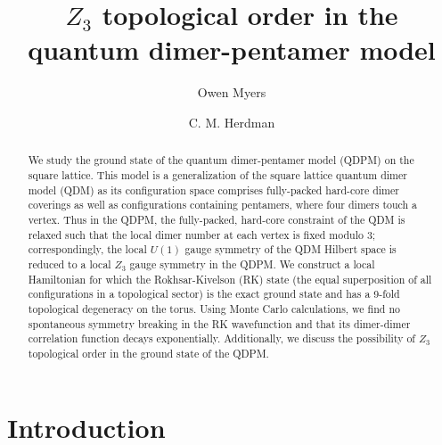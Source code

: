 \documentclass[twocolumn,prb,aps,floatfix,superscriptaddress]{revtex4-1}
\begin{document}
\title{$Z_3$ topological order in the quantum dimer-pentamer model}

\author{Owen Myers}

\author{C. M. Herdman}

\begin{abstract}
We study the ground state of the quantum dimer-pentamer model (QDPM) on the square lattice. This model is a generalization of the square lattice quantum dimer model (QDM) as its configuration space comprises fully-packed hard-core dimer coverings as well as configurations containing pentamers, where four dimers touch a vertex. Thus in the QDPM, the fully-packed, hard-core constraint of the QDM is relaxed such that the local dimer number at each vertex is fixed modulo 3; correspondingly, the local $U(1)$ gauge symmetry of the QDM Hilbert space is reduced to a local $Z_3$ gauge symmetry in the QDPM. We construct a local Hamiltonian for which the Rokhsar-Kivelson (RK) state (the equal superposition of all configurations in a topological sector) is the exact ground state and has a 9-fold topological degeneracy on the torus. Using Monte Carlo calculations, we find no spontaneous symmetry breaking in the RK wavefunction and that its dimer-dimer correlation function decays exponentially. Additionally, we discuss the possibility of $Z_3$ topological order in the ground state of the QDPM.
\end{abstract}

\maketitle

\section{Introduction}
\end{document}
